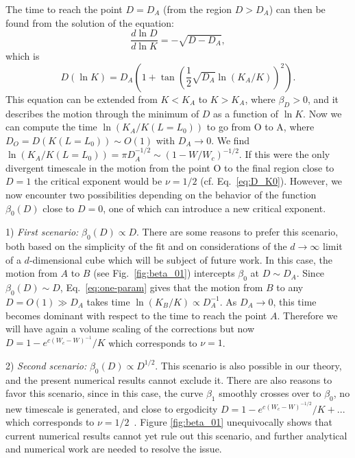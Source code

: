 \documentclass[reprint,aps,prl,superscriptaddress,english,nolongbibliography]{revtex4-2}
\begin{document}
{The time to reach the point $D=D_A$ (from the region $D>D_A$) can then be found from the solution of the equation:
\begin{equation}
    \frac{d\ln D}{d\ln K}=-\sqrt{D-D_A},
\end{equation}
which is 
\begin{equation}
    D(\ln K)=D_A\left(1+\tan\left(\frac{1}{2}\sqrt{D_A}\ln(K_A/K)\right)^2\right).
\label{eq:D_turn}
\end{equation}
This equation can be extended from $K<K_A$ to $K>K_A$, where $\beta_D>0$, and it describes the motion through the minimum of $D$ as a function of $\ln K$. Now we can compute the time $\ln(K_A/K(L=L_{0}))$ to go from O to A, where $D_{O}=D(K(L=L_{0}))\sim O(1)$ with $D_A\to 0$. We find $\ln(K_{A}/K(L=L_{0}))=\pi D_A^{-1/2}\sim (1-W/W_c)^{-1/2}$. If this were the only divergent timescale in the motion from the point O to the final region close to $D=1$ the critical exponent would be $\nu=1/2$ (cf. Eq.~\eqref{eq:D_K0}). However, we now encounter two possibilities depending on the behavior of the function $\beta_0(D)$ close to $D=0$, one of which can introduce a new critical exponent.

1) {\it First scenario:} $\beta_0(D)\propto D$. There are some reasons to prefer this scenario, both based on the simplicity of the fit and on considerations of the $d\to\infty$ limit of a $d$-dimensional cube which will be subject of future work. In this case, the motion from $A$ to $B$ (see Fig.~\ref{fig:beta_01}) intercepts $\beta_0$ at $D\sim D_A$. Since $\beta_0(D)\sim D$, Eq.~\eqref{eq:one-param} gives that the motion from $B$ to any $D=O(1)\gg D_A$ takes time $\ln(K_B/K)\propto D_A^{-1}$. As $D_A\to 0$, this time becomes dominant with respect to the time to reach the point $A$. Therefore we will have again a volume scaling of the corrections but now $D=1-e^{c(W_c-W)^{-1}}/K$ which corresponds to $\nu=1$.

2) {\it Second scenario:} $\beta_0(D)\propto D^{1/2}$. This scenario is also possible in our theory, and the present numerical results cannot exclude it. There are also reasons to favor this scenario, since in this case, the curve $\beta_1$ smoothly crosses over to $\beta_0$, no new timescale is generated, and close to ergodicity $D=1-e^{c(W_c-W)^{-1/2}}/K+...$ which corresponds to $\nu=1/2$~\cite{tikhonov2016anderson,tikhonov2021AndersonMBL}. Figure \ref{fig:beta_01} unequivocally shows that current numerical results cannot yet rule out this scenario, and further analytical and numerical work are needed to resolve the issue. 

}
\end{document}
